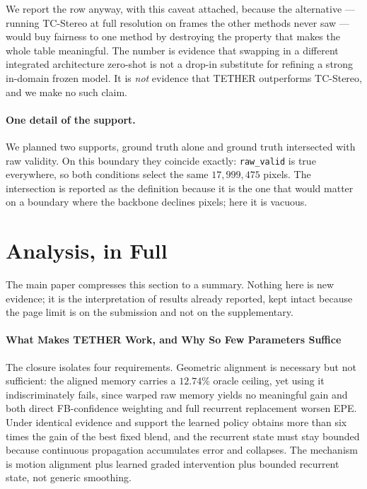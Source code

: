 \documentclass[letterpaper,10pt,conference]{ieeeconf}
\begin{document}
We report the row anyway, with this caveat attached, because the
alternative --- running TC-Stereo at full resolution on frames the other
methods never saw --- would buy fairness to one method by destroying the
property that makes the whole table meaningful. The number is evidence
that swapping in a different integrated architecture zero-shot is not a
drop-in substitute for refining a strong in-domain frozen model. It is
\emph{not} evidence that TETHER outperforms TC-Stereo, and we make no such
claim.

\paragraph{One detail of the support.} We planned two supports, ground
truth alone and ground truth intersected with raw validity. On this
boundary they coincide exactly: \texttt{raw\_valid} is true everywhere, so
both conditions select the same $17{,}999{,}475$ pixels. The intersection
is reported as the definition because it is the one that would matter on a
boundary where the backbone declines pixels; here it is vacuous.

\section{Analysis, in Full}

The main paper compresses this section to a summary. Nothing here is
new evidence; it is the interpretation of results already reported,
kept intact because the page limit is on the submission and not on the
supplementary.

\paragraph{What Makes TETHER Work, and Why So Few Parameters Suffice}

The closure isolates four requirements. Geometric alignment is necessary
but not sufficient: the aligned memory carries a $12.74\%$ oracle
ceiling, yet using it indiscriminately fails, since warped raw memory
yields no meaningful gain and both direct FB-confidence weighting and
full recurrent replacement worsen EPE. Under identical evidence and
support the learned policy obtains more than six times the gain of the
best fixed blend, and the recurrent state must stay bounded because
continuous propagation accumulates error and collapses. The mechanism is
motion alignment plus learned graded intervention plus bounded recurrent
state, not generic smoothing.
\end{document}
